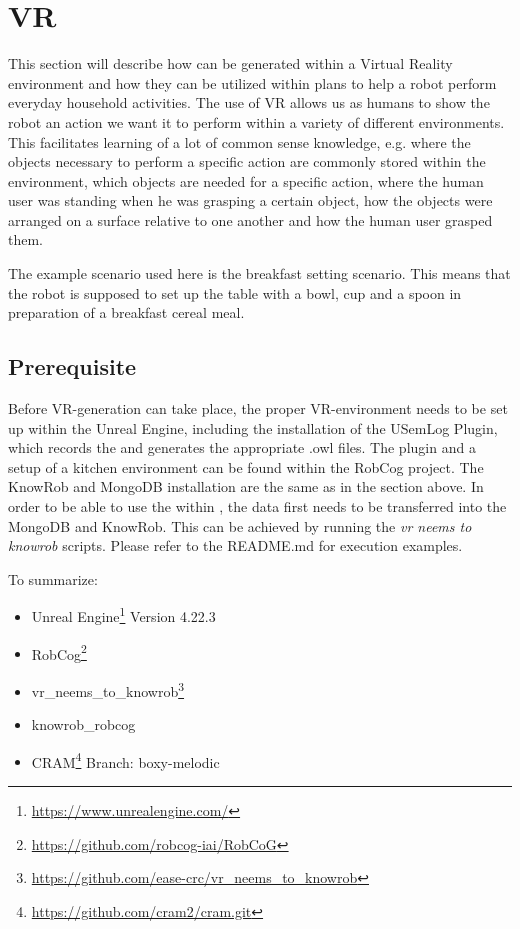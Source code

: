 \section{VR \neems}
\label{sec:vr-neem}
\lstset{style=lispcode}

This section will describe how \neems can be generated within a Virtual Reality environment and how they can be utilized within \cram plans to help a robot perform everyday household activities. The use of VR allows us as humans to show the robot an action we want it to perform within a variety of different environments. This facilitates learning of  a lot of common sense knowledge, e.g. where the objects necessary to perform a specific action are commonly stored within the environment, which objects are needed for a specific action, where the human user was standing when he was grasping a certain object, how the objects were arranged on a surface relative to one another and how the human user grasped them.  

The example scenario used here is the breakfast setting scenario. This means that the robot is supposed to set up the table with a bowl, cup and a spoon in preparation of a breakfast cereal meal. 

\subsection{Prerequisite}
Before VR-\neem generation can take place, the proper VR-environment needs to be set up within the Unreal Engine, including the installation of the USemLog Plugin, which records the \neems and generates the appropriate .owl files. The plugin and a setup of a kitchen environment can be found within the RobCog project. 
The KnowRob and MongoDB installation are the same as in the section above. 
In order to be able to use the \neems within \cram, the data first needs to be transferred into the MongoDB and KnowRob. This can be achieved by running the \textit{vr neems to knowrob} scripts. Please refer to the README.md for execution examples.

 
To summarize: 
\begin{itemize}
	\item Unreal Engine\footnote{\url{https://www.unrealengine.com/}} Version 4.22.3
	\item RobCog\footnote{\url{https://github.com/robcog-iai/RobCoG}}
	\item vr\_neems\_to\_knowrob\footnote{\url{https://github.com/ease-crc/vr_neems_to_knowrob}} 
	\item knowrob\_robcog 
	\item CRAM\footnote{\url{https://github.com/cram2/cram.git}} Branch: boxy-melodic

\end{itemize}

